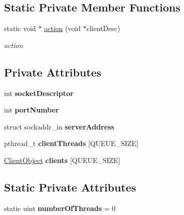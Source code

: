 \subsection*{Static Private Member Functions}
\begin{DoxyCompactItemize}
\item 
static void $\ast$ \hyperlink{classServer_a75b8fdcfd5e0438efe7bb79b317caa16}{action} (void $\ast$client\+Desc)
\begin{DoxyCompactList}\small\item\em action \end{DoxyCompactList}\end{DoxyCompactItemize}
\subsection*{Private Attributes}
\begin{DoxyCompactItemize}
\item 
\mbox{\label{classServer_a5e52b598760882795a7ea0aada7cb9b7}} 
int {\bfseries socket\+Descriptor}
\item 
\mbox{\label{classServer_a72256f23fe1dbb301a6a19e440f5d089}} 
int {\bfseries port\+Number}
\item 
\mbox{\label{classServer_a0a84291035718de02da7e2c4e661f2a1}} 
struct sockaddr\+\_\+in {\bfseries server\+Address}
\item 
\mbox{\label{classServer_a2659f052c537f44a27d2aef4ad079957}} 
pthread\+\_\+t {\bfseries client\+Threads} \mbox{[}Q\+U\+E\+U\+E\+\_\+\+S\+I\+ZE\mbox{]}
\item 
\mbox{\label{classServer_a2e06e7ad5573c0c5cf14f588e8377749}} 
\hyperlink{classClientObject}{Client\+Object} {\bfseries clients} \mbox{[}Q\+U\+E\+U\+E\+\_\+\+S\+I\+ZE\mbox{]}
\end{DoxyCompactItemize}
\subsection*{Static Private Attributes}
\begin{DoxyCompactItemize}
\item 
\mbox{\label{classServer_ab11a1028476d4235bf3a2d8f468d2b81}} 
static uint {\bfseries number\+Of\+Threads} = 0
\end{DoxyCompactItemize}


